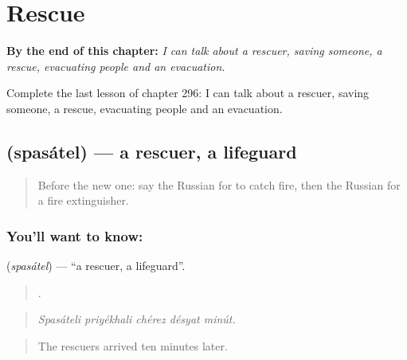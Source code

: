 
\chapter{Rescue}
\label{ch:ru-rescue}

\begin{chapteropening}
\textbf{By the end of this chapter:} \emph{I can talk about a rescuer, saving someone, a rescue, evacuating people and an evacuation.}

Complete the last lesson of chapter 296: I can talk about a rescuer, saving someone, a rescue, evacuating people and an evacuation.
\end{chapteropening}

\section[\texorpdfstring{\ru{спасатель} (spasátel)}{спасатель (spasátel)}]{ (spasátel) — a rescuer, a lifeguard}

\label{lesson:RU-C296-spasatel}



\begin{quote}
Before the new one: say the Russian for to catch fire, then the Russian for a fire extinguisher.
\end{quote}

\subsection*{You'll want to know: }
\textbf{} (\emph{spasátel}) — \textquotedblleft{}a rescuer, a lifeguard\textquotedblright{}.

\begin{quote}
    .
\end{quote}

\begin{quote}
\emph{Spasáteli priyékhali chérez désyat minút.}
\end{quote}

\begin{quote}
The rescuers arrived ten minutes later.
\end{quote}

